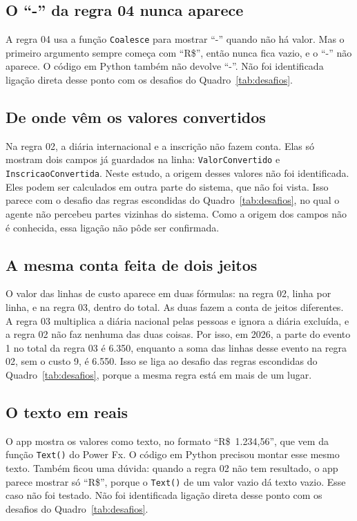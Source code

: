 \subsection*{O ``-'' da regra 04 nunca aparece}

A regra 04 usa a função \texttt{Coalesce} para mostrar ``-'' quando não há valor. Mas o primeiro argumento sempre começa com ``R\$'', então nunca fica vazio, e o ``-'' não aparece. O código em Python também não devolve ``-''. Não foi identificada ligação direta desse ponto com os desafios do Quadro~\ref{tab:desafios}.

\subsection*{De onde vêm os valores convertidos}

Na regra 02, a diária internacional e a inscrição não fazem conta. Elas só mostram dois campos já guardados na linha: \texttt{ValorConvertido} e \texttt{InscricaoConvertida}. Neste estudo, a origem desses valores não foi identificada. Eles podem ser calculados em outra parte do sistema, que não foi vista. Isso parece com o desafio das regras escondidas do Quadro~\ref{tab:desafios}, no qual o agente não percebeu partes vizinhas do sistema. Como a origem dos campos não é conhecida, essa ligação não pôde ser confirmada.

\subsection*{A mesma conta feita de dois jeitos}

O valor das linhas de custo aparece em duas fórmulas: na regra 02, linha por linha, e na regra 03, dentro do total. As duas fazem a conta de jeitos diferentes. A regra 03 multiplica a diária nacional pelas pessoas e ignora a diária excluída, e a regra 02 não faz nenhuma das duas coisas. Por isso, em 2026, a parte do evento 1 no total da regra 03 é 6.350, enquanto a soma das linhas desse evento na regra 02, sem o custo 9, é 6.550. Isso se liga ao desafio das regras escondidas do Quadro~\ref{tab:desafios}, porque a mesma regra está em mais de um lugar.

\subsection*{O texto em reais}

O app mostra os valores como texto, no formato ``R\$~1.234,56'', que vem da função \texttt{Text()} do Power Fx. O código em Python precisou montar esse mesmo texto. Também ficou uma dúvida: quando a regra 02 não tem resultado, o app parece mostrar só ``R\$'', porque o \texttt{Text()} de um valor vazio dá texto vazio. Esse caso não foi testado. Não foi identificada ligação direta desse ponto com os desafios do Quadro~\ref{tab:desafios}.

